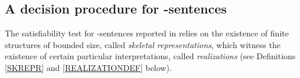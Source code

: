 \documentclass[a4paper]{llncs}
\newcommand{\inter}{\ensuremath{\mathbf{I}}\xspace}
\newcommand{\atset}{\mathcal{S}}
\newcommand{\vmodels}[2]{#1 \models_{\mathcal{V}} #2}
\newcommand{\vsat}[1]{\vmodels{*}{#1}}
\begin{document}
%
%
%

\subsection{A decision procedure for \Forallpizero-sentences}

The satisfiability test for \Forallpizero-sentences reported in
\cite{CanLonNic2011} relies on the existence of finite structures of
bounded size, called \emph{skeletal representations}, which witness
the existence of certain particular interpretations, called \emph{realizations}
(see Definitions \ref{SKREPR} and \ref{REALIZATIONDEF} below).

\end{document}

